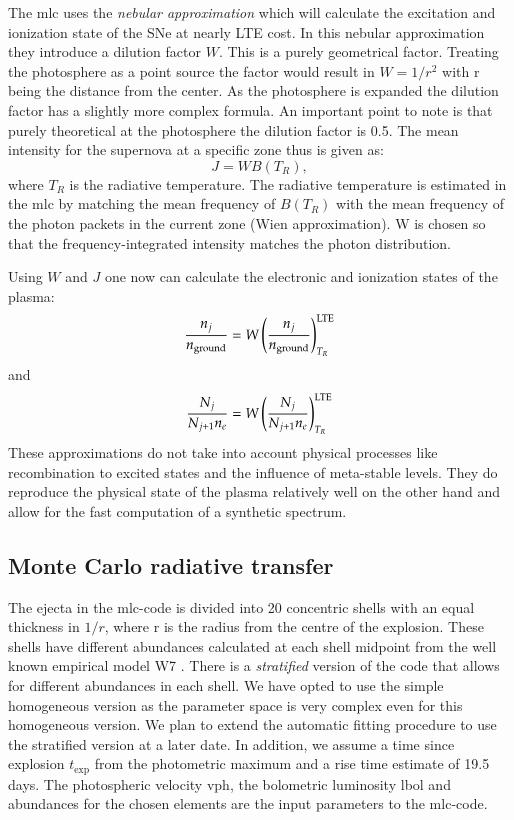 The \gls{mlc} uses the \textit{nebular approximation} which will calculate the excitation and ionization state of the SNe at nearly LTE cost. In this nebular approximation they introduce a dilution factor $W$. This is a purely geometrical factor. Treating the photosphere as a point source the factor would result in $W=1/r^2$ with r being the distance from the center. As the photosphere is expanded the dilution factor has a slightly more complex formula. An important point to note is that purely theoretical at the photosphere the dilution factor is 0.5.
The mean intensity for the supernova at a specific zone thus is given as:
\[
J = W B(T_R),
\]
where $T_R$ is the radiative temperature. The radiative temperature is estimated in the \gls{mlc} by matching the mean frequency of $B(T_R)$ with the mean frequency of the photon packets in the current zone (Wien approximation). W is chosen so that the frequency-integrated intensity matches the photon distribution. 

Using $W$ and $J$ one now can calculate the electronic and ionization states of the plasma:
\[
\frac{n_j}{n_{\rm ground}} = W \left( \frac{n_j}{n_{\rm ground}} \right) _{T_R}^{\rm LTE}
\]
and 
\[
\frac{N_j}{N_{j+1}n_e} = W \left( \frac{N_j}{N_{j+1}n_e} \right) _{T_R}^{\rm LTE}
\]
These approximations do not take into account physical processes like recombination to excited states and the influence of meta-stable levels. They do reproduce the physical state of the plasma relatively well on the other hand and allow for the fast computation of a synthetic spectrum.


\subsection{Monte Carlo radiative transfer}

The ejecta in the \gls{mlc}-code is divided into 20 concentric shells with an equal thickness in $1/r$, where r is the radius from the centre of the explosion. These shells have different abundances calculated at each shell midpoint from the well known empirical model W7 \citep{1984ApJ...286..644N}. There is a \textit{stratified} version of the code that allows for different abundances in each shell. We have opted to use the simple homogeneous version as the parameter space is very complex even for this homogeneous version. We plan to extend the automatic fitting procedure to use the stratified version at a later date. In addition, we assume a time since explosion $t_\textrm{exp}$ from the photometric maximum and a rise time estimate of 19.5 days. The photospheric velocity \gls{vph}, the bolometric luminosity \gls{lbol} and abundances for the chosen elements are the input parameters to the \gls{mlc}-code. 

